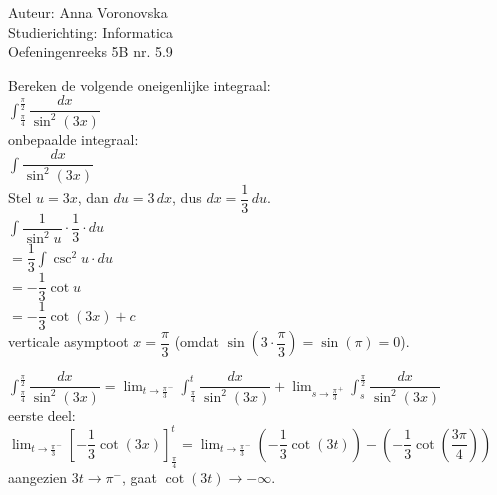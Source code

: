 \documentclass[a4paper]{article}
\begin{document}
  
\noindent \large Auteur: Anna Voronovska \\
\noindent \large Studierichting: Informatica\\
\noindent \large Oefeningenreeks 5B nr. 5.9\\

\medskip

\normalsize

Bereken de volgende oneigenlijke integraal: \\

$\displaystyle \int_{\tfrac{\pi}{4}}^{\tfrac{\pi}{2}} \dfrac{dx}{\sin^{2}(3x)}$ \\

onbepaalde integraal: \\

$\displaystyle \int \dfrac{dx}{\sin^{2}(3x)}$ \\

Stel $u = 3x$, dan $du = 3\,dx$, dus $dx = \dfrac{1}{3}\,du$. \\

$\displaystyle \int \dfrac{1}{\sin^{2} u} \cdot \dfrac{1}{3} \cdot du$ \\

$= \dfrac{1}{3} \int \csc^{2} u \cdot du$ \\

$= -\dfrac{1}{3} \cot u$ \\

$ = -\dfrac{1}{3} \cot(3x) + c$ \\

verticale asymptoot $x = \dfrac{\pi}{3}$ (omdat $\sin(3 \cdot \dfrac{\pi}{3}) = \sin(\pi) = 0$).

$\displaystyle \int_{\tfrac{\pi}{4}}^{\tfrac{\pi}{2}} \dfrac{dx}{\sin^{2}(3x)} = \lim_{t \to \tfrac{\pi}{3}^{-}} \int_{\tfrac{\pi}{4}}^{t} \dfrac{dx}{\sin^{2}(3x)} + \lim_{s \to \tfrac{\pi}{3}^{+}} \int_{s}^{\tfrac{\pi}{2}} \dfrac{dx}{\sin^{2}(3x)}$ \\

eerste deel: \\

$\displaystyle \lim_{t \to \tfrac{\pi}{3}^{-}} \left[ -\dfrac{1}{3} \cot(3x) \right]_{\tfrac{\pi}{4}}^{t} = \lim_{t \to \tfrac{\pi}{3}^{-}} \left( -\dfrac{1}{3} \cot(3t) \right) - \left( -\dfrac{1}{3} \cot\left(\dfrac{3\pi}{4}\right) \right)$ \\

aangezien $3t \to \pi^{-}$, gaat $\cot(3t) \to -\infty$. \\
\end{document}
